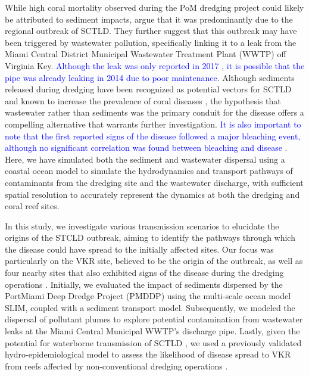 \documentclass[preprint,12pt,authoryear]{elsarticle}
\newcommand{\modif}[1]{\textcolor{blue}{#1}}
\begin{document}
While high coral mortality observed during the PoM dredging project could likely be attributed to sediment impacts, \cite{gintert2019regional} argue that it was predominantly due to the regional outbreak of SCTLD. They further suggest that this outbreak may have been triggered by wastewater pollution, specifically linking it to a leak from the Miami Central District Municipal Wastewater Treatment Plant (WWTP) off Virginia Key. \modif{Although the leak was only reported in 2017 \citep{staletovich2017}, it is possible that the pipe was already leaking in 2014 due to poor maintenance}. Although sediments released during dredging have been recognized as potential vectors for SCTLD \citep{studivan2022reef} and known to increase the prevalence of coral diseases \citep{pollock2014sediment}, the hypothesis that wastewater rather than sediments was the primary conduit for the disease offers a compelling alternative that warrants further investigation. \modif{It is also important to note that the first reported signs of the disease followed a major bleaching event, although no significant correlation was found between bleaching and disease \citep{spadafore2021multi}}. Here, we have simulated both the sediment and wastewater dispersal using a coastal ocean model to simulate the hydrodynamics and transport pathways of contaminants from the dredging site and the wastewater discharge, with sufficient spatial resolution to accurately represent the dynamics at both the dredging and coral reef sites.

In this study, we investigate various transmission scenarios to elucidate the origins of the STCLD outbreak, aiming to identify the pathways through which the disease could have spread to the initially affected sites. Our focus was particularly on the VKR site, believed to be the origin of the outbreak, as well as four nearby sites that also exhibited signs of the disease during the dredging operations \citep{precht2016unprecedented}. Initially, we evaluated the impact of sediments dispersed by the PortMiami Deep Dredge Project (PMDDP) using the multi-scale ocean model SLIM, coupled with a sediment transport model. Subsequently, we modeled the dispersal of pollutant plumes to explore potential contamination from wastewater leaks at the Miami Central Municipal WWTP’s discharge pipe. Lastly, given the potential for waterborne transmission of SCTLD \citep{aeby2019pathogenesis,eaton2021measuring, meiling2021variable}, we used a previously validated hydro-epidemiological model to assess the likelihood of disease spread to VKR from reefs affected by non-conventional dredging operations \citep{dobbelaere2022connecting}.
\end{document}
